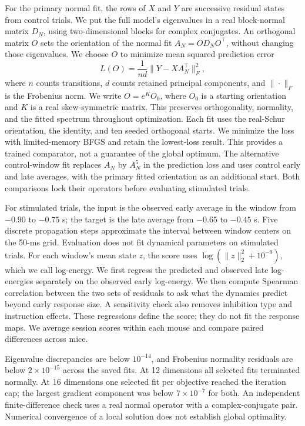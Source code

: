 \documentclass[aps,10pt,onecolumn,superscriptaddress,nofootinbib,
  longbibliography,amsmath,amssymb,floatfix]{revtex4-2}
\begin{document}
For the primary normal fit, the rows of \(X\) and \(Y\) are
successive residual states from control trials. We put the full
model's eigenvalues in a real block-normal matrix \(D_N\), using
two-dimensional blocks for complex conjugates. An orthogonal
matrix \(O\) sets the orientation of the normal fit
\(A_N=O D_N O^\top\), without changing those eigenvalues.
We choose \(O\) to minimize mean squared prediction error
\begin{equation}
 L(O)=\frac{1}{nd}\|Y-XA_N^\top\|_F^2,
\end{equation}
where \(n\) counts transitions, \(d\) counts retained principal
components, and \(\|\cdot\|_F\) is the Frobenius norm. We write
\(O=e^K O_0\), where \(O_0\) is a starting orientation and \(K\)
is a real skew-symmetric matrix. This preserves orthogonality,
normality, and the fitted spectrum throughout optimization.
Each fit uses the real-Schur orientation, the identity, and ten seeded
orthogonal starts. We minimize the loss with limited-memory BFGS and
retain the lowest-loss result. This provides a trained comparator,
not a guarantee of the global optimum. The alternative control-window
fit replaces \(A_N\) by \(A_N^5\) in the prediction loss and uses
control early and late averages, with the primary fitted orientation
as an additional start. Both comparisons lock their operators before
evaluating stimulated trials.

For stimulated trials, the input is the observed early average in the
window from \(-0.90\) to \(-0.75\) s; the target is the late average
from \(-0.65\) to \(-0.45\) s. Five discrete propagation steps approximate the
interval between window centers on the 50-ms grid. Evaluation does not
fit dynamical parameters on stimulated trials. For each window's
mean state \(z\), the score uses \(\log(\|z\|_2^2+10^{-9})\),
which we call log-energy. We first regress the predicted and
observed late log-energies separately on the observed early
log-energy. We then compute Spearman correlation between the
two sets of residuals to ask what the dynamics predict beyond
early response size. A sensitivity check also removes inhibition
type and instruction effects. These regressions define the
score; they do not fit the response maps. We average session
scores within each mouse and compare paired differences across mice.

Eigenvalue discrepancies are below \(10^{-14}\), and Frobenius
normality residuals are below \(2\times10^{-15}\) across the saved fits.
At 12 dimensions all selected fits terminated normally. At 16 dimensions
one selected fit per objective reached the iteration cap; the largest
gradient component was below \(7\times10^{-7}\) for both. An
independent finite-difference check uses a real normal operator with
a complex-conjugate pair. Numerical convergence of a local solution
does not establish global optimality.
\end{document}
